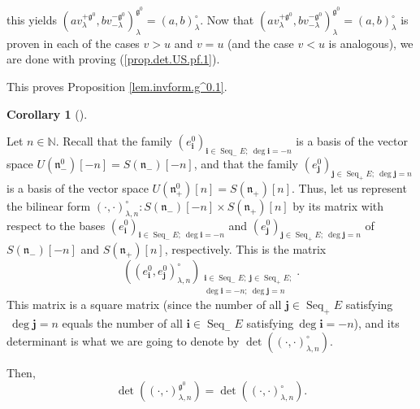 \documentclass
[numbers=enddot,12pt,final,onecolumn,german,notitlepage]{scrartcl}%
\theoremstyle{definition}
\newtheorem{coro}[theo]{Corollary}
\newenvironment{corollary}[1][]
{\begin{coro}[#1]\begin{leftbar}}
{\end{leftbar}\end{coro}}
\begin{document}
this yields $\left(  av_{\lambda}^{+\mathfrak{g}^{0}},bv_{-\lambda
}^{-\mathfrak{g}^{0}}\right)  _{\lambda}^{\mathfrak{g}^{0}}=\left(
a,b\right)  _{\lambda}^{\circ}$. Now that $\left(  av_{\lambda}^{+\mathfrak{g}%
^{0}},bv_{-\lambda}^{-\mathfrak{g}^{0}}\right)  _{\lambda}^{\mathfrak{g}^{0}%
}=\left(  a,b\right)  _{\lambda}^{\circ}$ is proven in each of the cases $v>u$
and $v=u$ (and the case $v<u$ is analogous), we are done with proving
(\ref{prop.det.US.pf.1}).

This proves Proposition \ref{lem.invform.g^0.1}.

\begin{corollary}
\label{cor.invform.g^0.1}Let $n\in\mathbb{N}$. Recall that the family $\left(
e_{\mathbf{i}}^{0}\right)  _{\mathbf{i}\in\operatorname*{Seq}\nolimits_{-}%
E;\ \deg\mathbf{i}=-n}$ is a basis of the vector space $U\left(
\mathfrak{n}_{-}^{0}\right)  \left[  -n\right]  =S\left(  \mathfrak{n}%
_{-}\right)  \left[  -n\right]  $, and that the family $\left(  e_{\mathbf{j}%
}^{0}\right)  _{\mathbf{j}\in\operatorname*{Seq}\nolimits_{+}E;\ \deg
\mathbf{j}=n}$ is a basis of the vector space $U\left(  \mathfrak{n}_{+}%
^{0}\right)  \left[  n\right]  =S\left(  \mathfrak{n}_{+}\right)  \left[
n\right]  $. Thus, let us represent the bilinear form $\left(  \cdot
,\cdot\right)  _{\lambda,n}^{\circ}:S\left(  \mathfrak{n}_{-}\right)  \left[
-n\right]  \times S\left(  \mathfrak{n}_{+}\right)  \left[  n\right]  $ by its
matrix with respect to the bases $\left(  e_{\mathbf{i}}^{0}\right)
_{\mathbf{i}\in\operatorname*{Seq}\nolimits_{-}E;\ \deg\mathbf{i}=-n}$ and
$\left(  e_{\mathbf{j}}^{0}\right)  _{\mathbf{j}\in\operatorname*{Seq}%
\nolimits_{+}E;\ \deg\mathbf{j}=n}$ of $S\left(  \mathfrak{n}_{-}\right)
\left[  -n\right]  $ and $S\left(  \mathfrak{n}_{+}\right)  \left[  n\right]
$, respectively. This is the matrix%
\[
\left(  \left(  e_{\mathbf{i}}^{0},e_{\mathbf{j}}^{0}\right)  _{\lambda
,n}^{\circ}\right)  _{\substack{\mathbf{i}\in\operatorname*{Seq}%
\nolimits_{-}E;\ \mathbf{j}\in\operatorname*{Seq}\nolimits_{+}E;\\\deg
\mathbf{i}=-n;\ \deg\mathbf{j}=n}}.
\]
This matrix is a square matrix (since the number of all $\mathbf{j}%
\in\operatorname*{Seq}\nolimits_{+}E$ satisfying$\ \deg\mathbf{j}=n$ equals
the number of all $\mathbf{i}\in\operatorname*{Seq}\nolimits_{-}E$
satisfying$\ \deg\mathbf{i}=-n$), and its determinant is what we are going to
denote by $\det\left(  \left(  \cdot,\cdot\right)  _{\lambda,n}^{\circ
}\right)  $.

Then,%
\[
\det\left(  \left(  \cdot,\cdot\right)  _{\lambda,n}^{\mathfrak{g}^{0}%
}\right)  =\det\left(  \left(  \cdot,\cdot\right)  _{\lambda,n}^{\circ
}\right)  .
\]

\end{corollary}
\end{document}
